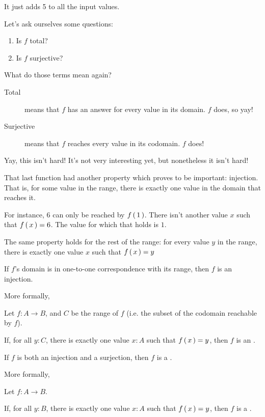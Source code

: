 \begin{example}
    It just adds 5 to all the input values.

    Let's ask ourselves some questions:

    \begin{enumerate}
      \item Is $f$ total?
      \item Is $f$ surjective?
    \end{enumerate}

    What do those terms mean again?

    \begin{description}
      \item[Total] means that $f$ has an answer for every value in its
        domain. $f$ does, so yay!
      \item[Surjective] means that $f$ reaches every value in its codomain. $f$
        does!
    \end{description}

    Yay, this isn't hard! It's not very interesting yet, but nonetheless it
    isn't hard!
\end{example}

That last function had another property which proves to be important:
injection. That is, for some value in the range, there is exactly one value
in the domain that reaches it.

For instance, $6$ can only be reached by $f \left(\, 1 \,\right)$. There isn't another value
$x$ such that $f \left(\, x \,\right) = 6$. The  value for which that holds is
$1$.

The same property holds for the rest of the range: for every value $y$ in the
range, there is exactly one value $x$ such that $f \left(\, x \,\right) = y$

\begin{definition}[Injection]
    If $f$'s domain is in one-to-one correspondence with
    its range, then $f$ is an injection.

    More formally,

    \begin{textmath}
        Let $f : A \to B$, and $C$ be the range of $f$ (i.e. the subset of the
        codomain reachable by $f$).

        If, for all $y : C$, there is exactly one value $x : A$ such that
        $f \left(\, x \,\right) = y$, then $f$ is an .
    \end{textmath}
\end{definition}

\begin{definition}[Bijection]
    If $f$ is both an injection and a surjection, then $f$ is a
    .

    More formally,

    \begin{textmath}
        Let $f : A \to B$.

        If, for all $y : B$, there is exactly one value $x : A$ such that
        $f \left(\, x \,\right) = y$, then $f$ is a .
    \end{textmath}
\end{definition}

